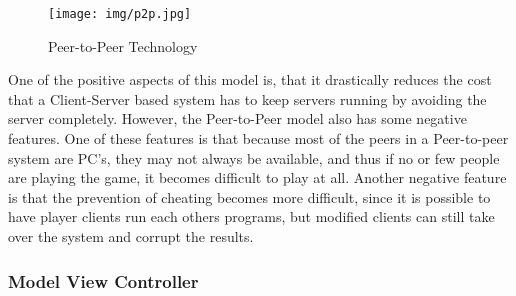\begin{figure}[h]
  \centering
    \texttt{[image: img/p2p.jpg]}
  \caption{Peer-to-Peer Technology \citep{PeerToPeer}}
  \label{fig:p2p}
\end{figure}

One of the positive aspects of this model is, that it drastically reduces the cost that a Client-Server based system has to keep servers running by avoiding the server completely. However, the Peer-to-Peer model also has some negative features. One of these features is that because most of the peers in a Peer-to-peer system are PC's, they may not always be available, and thus if no or few people are playing the game, it becomes difficult to play at all. Another negative feature is that the prevention of cheating becomes more difficult, since it is possible to have player clients run each others programs, but modified clients can still take over the system and corrupt the results.\newline

\subsubsection{Model View Controller}
